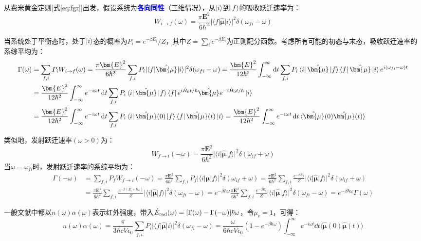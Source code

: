 从费米黄金定则[式\eqref{eq:fgr}]出发，假设系统为\textcolor{blue}{\textbf{各向同性}}（三维情况），从$\ket{i}$到$\ket{f}$的吸收跃迁速率为：
\[W_{i\to f}(\omega)=\frac{\pi\bm{E}^2}{6\hbar^2}|\langle f|\hat{\bm{\mu}}|i\rangle|^2\delta(\omega_{fi}-\omega)\]

当系统处于平衡态时，处于$\ket{i}$态的概率为$P_i=e^{-\beta E_i}/Z$，其中$Z=\sum_i e^{-\beta E_i}$为正则配分函数。考虑所有可能的初态与末态，吸收跃迁速率的系综平均为：
\[\begin{aligned}
\Gamma(\omega)&=\sum_{f,i}P_iW_{i \to f}(\omega)=\frac{\pi\bm{E}^2}{6\hbar^2}\sum_{f,i}P_i|\langle f|\hat{\bm{\mu}}|i\rangle|^2\delta(\omega_{fi}-\omega)=\frac{\bm{E}^2}{12\hbar^2}\int_{-\infty}^{\infty}\dd{t}\sum_{f,i}P_i\bra{i}\hat{\bm{\mu}}\ket{f}\bra{f}\hat{\bm{\mu}}\ket{i}e^{i(\omega_{fi}-\omega)t}\\
&=\frac{\bm{E}^2}{12\hbar^2}\int_{-\infty}^{\infty}e^{-i\omega t}\dd{t}\sum_{f,i}P_i\bra{i}\hat{\bm{\mu}}\ket{f}\bra{f}e^{i\hat{H}_0t/\hbar}\hat{\bm{\mu}}e^{-i\hat{H}_0t/\hbar}\ket{i}\\
&=\frac{\bm{E}^2}{12\hbar^2}\int_{-\infty}^{\infty}e^{-i\omega t}\dd{t}\sum_{f,i}P_i\bra{i}\hat{\bm{\mu}}(0)\ket{f}\bra{f}\hat{\bm{\mu}}(t)\ket{i}=\frac{\bm{E}^2}{12\hbar^2}\int_{-\infty}^{\infty}e^{-i\omega t}\dd{t}\langle\hat{\bm{\mu}}(0)\hat{\bm{\mu}}(t)\rangle\\
\end{aligned}\]

类似地，发射跃迁速率$(\omega>0)$为：
\[W_{f\to i}(-\omega)=\frac{\pi\bm{E}^2}{6\hbar^2}|\langle i|\hat{\bm{\mu}}|f\rangle|^2\delta(\omega_{if}+\omega)\]
当$\omega=\omega_{fi}$时，发射跃迁速率的系综平均为：
\[\begin{aligned}
\Gamma(-\omega)&=\sum_{f,i}P_fW_{f \to i}(-\omega)=\frac{\pi\bm{E}^2}{6\hbar^2}\sum_{f,i}P_f|\langle i|\hat{\bm{\mu}}|f\rangle|^2\delta(\omega_{if}+\omega)=\frac{\pi\bm{E}^2}{6\hbar^2}\sum_{f,i}\frac{e^{-\beta E_f}}{Z}|\langle i|\hat{\bm{\mu}}|f\rangle|^2\delta(\omega_{if}+\omega)\\
&=\frac{\pi\bm{E}^2}{6\hbar^2}\sum_{f,i}\frac{e^{-\beta (E_i+\hbar\omega)}}{Z}|\langle i|\hat{\bm{\mu}}|f\rangle|^2\delta(\omega_{fi}-\omega)=e^{-\beta\hbar\omega}\frac{\pi\bm{E}^2}{6\hbar^2}\sum_{f,i}\frac{e^{-\beta E_i}}{Z}|\langle i|\hat{\bm{\mu}}|f\rangle|^2\delta(\omega_{fi}-\omega)=e^{-\beta\hbar\omega}\Gamma(\omega)
\end{aligned}\]

一般文献中都以$n(\omega)\alpha(\omega)$表示红外强度，带入$\dot{E}_{\rm{rad}}(\omega)=[\Gamma(\omega)-\Gamma(-\omega)]\hbar\omega$，令$\mu_r=1$，可得：
\begin{equation}\label{eq:IR_qm_1}
n(\omega)\alpha(\omega)=\frac{\pi}{3\hbar cV\epsilon_0}\sum_{f,i}P_i|\langle f|\hat{\bm{\mu}}|i\rangle|^2\delta(\omega_{fi}-\omega)=\frac{\omega}{6\hbar cV\epsilon_0}(1-e^{-\beta\hbar\omega})\int_{-\infty}^{\infty}e^{-i\omega t}\dd{t}\langle\hat{\bm{\mu}}(0)\hat{\bm{\mu}}(t)\rangle
\end{equation}

